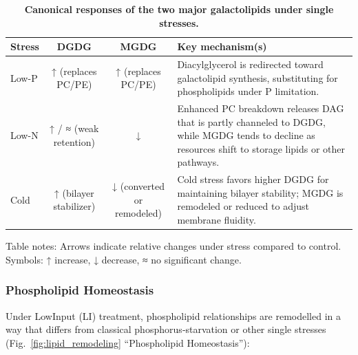 \documentclass[10pt,letterpaper]{article}
\begin{document}
\begin{table}[!ht]
  \begin{adjustwidth}{-2.25in}{0in} %
    \centering
    \caption{{\bf Canonical responses of the two major galactolipids under single stresses.}}
    \begin{tabular}{|l|c|c|p{3.8in}|}
      \hline
      \textbf{Stress} & \textbf{DGDG} & \textbf{MGDG} & \textbf{Key mechanism(s)} \\ \hline
      Low-P  & ↑ (replaces PC/PE) & ↑ (replaces PC/PE) & Diacylglycerol is redirected toward galactolipid synthesis, substituting for phospholipids under P limitation. \\ \hline
      Low-N  & ↑ / ≈ (weak retention) & ↓ & Enhanced PC breakdown releases DAG that is partly channeled to DGDG, while MGDG tends to decline as resources shift to storage lipids or other pathways. \\ \hline
      Cold   & ↑ (bilayer stabilizer) & ↓ (converted or remodeled) & Cold stress favors higher DGDG for maintaining bilayer stability; MGDG is remodeled or reduced to adjust membrane fluidity. \\ \hline
    \end{tabular}
    \begin{flushleft}
      Table notes: Arrows indicate relative changes under stress compared to control. Symbols: ↑ increase, ↓ decrease, ≈ no significant change.
    \end{flushleft}
    \label{table:galactolipid_responses}
  \end{adjustwidth}
\end{table}


\subsubsection*{Phospholipid Homeostasis}

Under LowInput (LI) treatment, phospholipid relationships are remodelled in a way that differs from classical phosphorus‐starvation or other single stresses (Fig.~\ref{fig:lipid_remodeling} “Phospholipid Homeostasis”):
\end{document}

